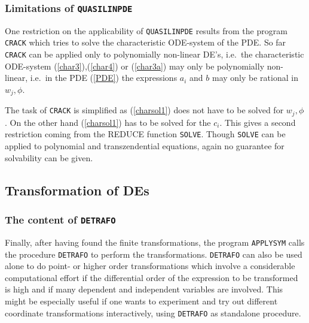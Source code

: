 \subsubsection{Limitations of \texttt{QUASILINPDE}}
One restriction on the applicability of \texttt{QUASILINPDE} results from
the program \texttt{CRACK} which tries to solve the
characteristic ODE-system of the PDE. So far \texttt{CRACK} can be
applied only to polynomially non-linear DE's, i.e.\ the characteristic 
ODE-system (\ref{char3}),(\ref{char4}) or (\ref{char3a}) may
only be polynomially non-linear, i.e.\ in the PDE (\ref{PDE})
the expressions $a_i$ and $b$ may only be rational in $w_j,\phi$.

The task of \texttt{CRACK} is simplified as (\ref{charsol1}) does not have to
be solved for $w_j, \phi$. On the other hand (\ref{charsol1}) has to be
solved for the $c_i$. This gives a 
second restriction coming from the REDUCE function \texttt{SOLVE}.
Though \texttt{SOLVE} can be applied
to polynomial and transzendential equations, again no guarantee for
solvability can be given.
\subsection{Transformation of DEs}
\subsubsection{The content of \texttt{DETRAFO}}
Finally, after having found the finite transformations,
the program \texttt{APPLYSYM} calls the procedure
\texttt{DETRAFO} to perform the transformations. \texttt{DETRAFO}
can also be used alone to do point- or higher order transformations
which involve a considerable computational effort if the
differential order of the expression to be transformed is high and
if many dependent and independent variables are involved.
This might be especially useful if one wants to experiment
and try out different coordinate transformations interactively,
using \texttt{DETRAFO} as standalone procedure.

